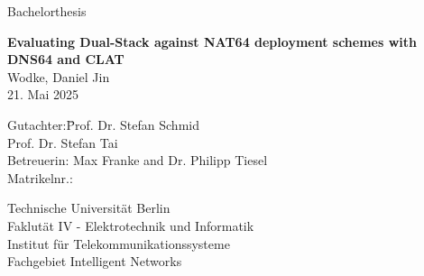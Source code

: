 \documentclass[a4paper, 12pt]{report}
\begin{document}
\begin{titlepage}
\begin{centering}
			\vspace{7mm}
			
			\LARGE
			
			Bachelorthesis
			
			\textbf{Evaluating Dual-Stack against NAT64 deployment schemes with DNS64 and CLAT}\\[2.5cm]
			
			
			\large
			Wodke, Daniel Jin\\
			21. Mai 2025\\[3.2cm]
			
			\begin{minipage}{\linewidth} 
				\begin{tabbing}
					Gutachter:\quad \=Prof. Dr. Stefan Schmid\\
					\> Prof. Dr. Stefan Tai\\
					Betreuerin:       \> Max Franke and Dr. Philipp Tiesel\\
					Matrikelnr.: \\
				\end{tabbing}
			\end{minipage}
			
			\vfill
			
			\normalsize
			{Technische Universität Berlin}\\
			{Faklutät IV - Elektrotechnik und Informatik}\\
			{Institut für Telekommunikationssysteme}\\
			{Fachgebiet Intelligent Networks}\\
		\end{centering}
	\end{titlepage}
	
	\newpage
	
	\newpage
	
	\newpage
	
	\tableofcontents
	\newpage
	\clearpage
	\printglossaries

	\newpage

	
	
	
	

	
	
	
	
	
	

	
	
	
\end{document}
